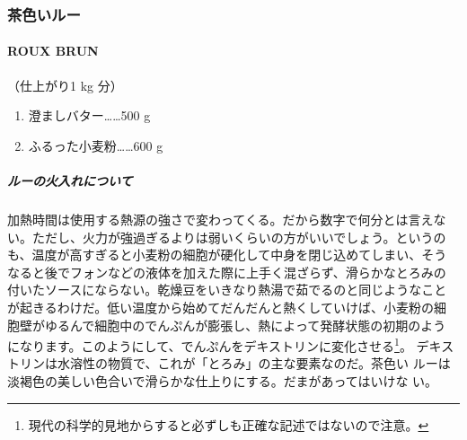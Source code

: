 \documentclass[twoside,12Q,b5j]{escoffierltjsbook}
\def\tightlist{\itemsep1pt\parskip0pt\parsep0pt}
\newenvironment{recette}{\begin{multicols}{2}}{\end{multicols}}
\begin{document}
\begin{recette}

  
\subsubsection{茶色いルー}\label{ux8336ux8272ux3044ux30ebux30fc}

\paragraph{ROUX BRUN}\label{roux-brun}


（仕上がり1 kg 分）

\begin{enumerate}
\def\labelenumi{\arabic{enumi}.}
\tightlist
\item
  澄ましバター\ldots{}\ldots{}500 g
\item
  ふるった小麦粉\ldots{}\ldots{}600 g
\end{enumerate}

\vspace*{2\zw}

\subparagraph{ルーの火入れについて}\label{cuisson-du-roux}


加熱時間は使用する熱源の強さで変わってくる。だから数字で何分とは言えな
い。ただし、火力が強過ぎるよりは弱いくらいの方がいいでしょう。というの
も、温度が高すぎると小麦粉の細胞が硬化して中身を閉じ込めてしまい、そう
なると後でフォンなどの液体を加えた際に上手く混ざらず、滑らかなとろみの
付いたソースにならない。乾燥豆をいきなり熱湯で茹でるのと同じようなこと
が起きるわけだ。低い温度から始めてだんだんと熱くしていけば、小麦粉の細
胞壁がゆるんで細胞中のでんぷんが膨張し、熱によって発酵状態の初期のよう
になります。このようにして、でんぷんをデキストリンに変化させる\footnote{現代の科学的見地からすると必ずしも正確な記述ではないので注意。}。
デキストリンは水溶性の物質で、これが「とろみ」の主な要素なのだ。茶色い
ルーは淡褐色の美しい色合いで滑らかな仕上りにする。だまがあってはいけな
い。


\end{recette}
\end{document}
